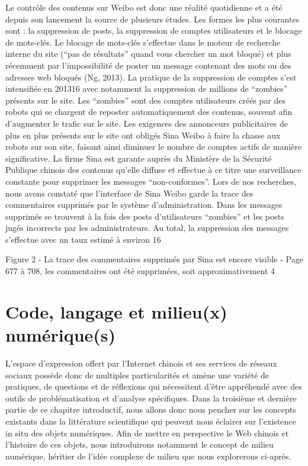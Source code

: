 Le contrôle des contenus sur Weibo est donc une réalité quotidienne et a été depuis son lancement la source de plusieurs études. Les formes les plus courantes sont : la suppression de posts, la suppression de comptes utilisateurs et le blocage de mots-clés. Le blocage de mots-clés s’effectue dans le moteur de recherche interne du site (“pas de résultats” quand vous chercher un mot bloqué) et plus récemment par l’impossibilité de poster un message contenant des mots ou des adresses web bloqués (Ng, 2013). La pratique de la suppression de comptes s’est intensifiée en 201316 avec notamment la suppression de millions de “zombies” présents sur le site. Les “zombies” sont des comptes utilisateurs créés par des robots qui se chargent de reposter automatiquement des contenus, souvent afin d’augmenter le trafic sur le site. Les exigences des annonceurs publicitaires de plus en plus présents sur le site ont obligés Sina Weibo à faire la chasse aux robots sur son site, faisant ainsi diminuer le nombre de comptes actifs de manière significative. La firme Sina est garante auprès du Ministère de la Sécurité Publique chinois des contenus qu’elle diffuse et effectue à ce titre une surveillance constante pour supprimer les messages “non-conformes”. Lors de nos recherches, nous avons constaté que l’interface de Sina Weibo garde la trace des commentaires supprimés par le système d’administration. Dans les messages supprimés se trouvent à la fois des posts d’utilisateurs “zombies” et les posts jugés incorrects par les administrateurs. Au total, la suppression des messages s’effectue avec un taux estimé à environ 16%


Figure 2 - La trace des commentaires supprimés par Sina est encore visible - Page 677 à 708, les commentaires ont été supprimées, soit approximativement 4%

\section[Code, langage et milieu(x) numérique(s)]{ Code, langage et milieu(x) numérique(s)}
L’espace d’expression offert par l’Internet chinois et ses services de réseaux sociaux possède donc de multiples particularités et amène une variété de pratiques, de questions et de réflexions qui nécessitent d’être appréhendé avec des outils de problématisation et d’analyse spécifiques. Dans la troisième et dernière partie de ce chapitre introductif, nous allons donc nous pencher sur les concepts existants dans la littérature scientifique qui peuvent nous éclairer sur l’existence in situ des objets numériques. Afin de mettre en perspective le Web chinois et l’histoire de ces objets, nous introduirons notamment le concept de milieu numérique, héritier de l’idée complexe de milieu que nous explorerons ci-après.

